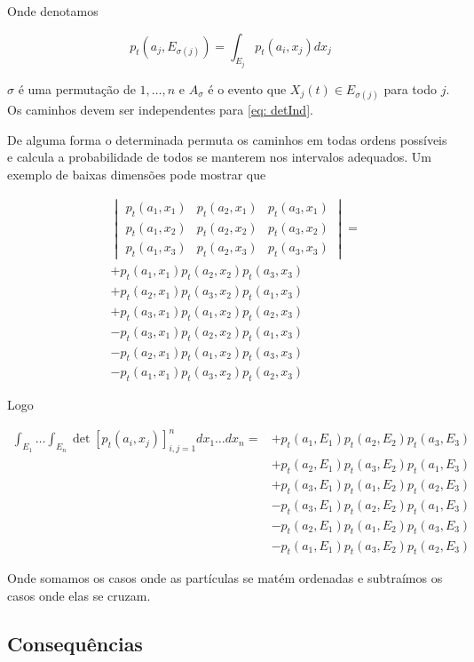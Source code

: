 Onde denotamos

\[
	p_t(a_j, E_{\sigma(j)}) = \int_{E_j} p_t(a_i, x_j) dx_j
\]

$\sigma$ é uma permutação de ${1, \dots, n}$ e $A_{\sigma}$ é o evento que $X_j(t) \in E_{\sigma(j)}$ para todo $j$. Os caminhos devem ser independentes para \ref{eq: detInd}.

De alguma forma o determinada permuta os caminhos em todas ordens possíveis e calcula a probabilidade de todos se manterem nos intervalos adequados. Um exemplo de baixas dimensões pode mostrar que


\begin{align}
	&
	\begin{vmatrix}
		p_t(a_1, x_1) & p_t(a_2, x_1) & p_t(a_3, x_1) \\
		p_t(a_1, x_2) & p_t(a_2, x_2) & p_t(a_3, x_2) \\
		p_t(a_1, x_3) & p_t(a_2, x_3) & p_t(a_3, x_3)
	\end{vmatrix} =\\
	&
	+ p_t(a_1, x_1) p_t(a_2, x_2) p_t(a_3, x_3)  \\
	&
	+ p_t(a_2, x_1) p_t(a_3, x_2) p_t(a_1, x_3) \\
	&
	+ p_t(a_3, x_1) p_t(a_1, x_2) p_t(a_2, x_3) \\
	& 
	- p_t(a_3, x_1) p_t(a_2, x_2) p_t(a_1, x_3) \\
	&
	-  p_t(a_2, x_1) p_t(a_1, x_2) p_t(a_3, x_3) \\
	&
	- p_t(a_1, x_1) p_t(a_3, x_2) p_t(a_2, x_3)
\end{align}

Logo

\begin{align}
	\int_{E_1} \dots \int_{E_n} \det{[p_t(a_i, x_j)]^{n}_{i,j=1}}  dx_1 \dots dx_n  = 
	&
	+ p_t(a_1, E_1) p_t(a_2, E_2) p_t(a_3, E_3)  \\
	&
	+ p_t(a_2, E_1) p_t(a_3, E_2) p_t(a_1, E_3) \\
	&
	+ p_t(a_3, E_1) p_t(a_1, E_2) p_t(a_2, E_3) \\
	& 
	- p_t(a_3, E_1) p_t(a_2, E_2) p_t(a_1, E_3) \\
	&
	-  p_t(a_2, E_1) p_t(a_1, E_2) p_t(a_3, E_3) \\
	&
	- p_t(a_1, E_1) p_t(a_3, E_2) p_t(a_2, E_3)
\end{align}

Onde somamos os casos onde as partículas se matém ordenadas e subtraímos os casos onde elas se cruzam.


\subsection{Consequências}

